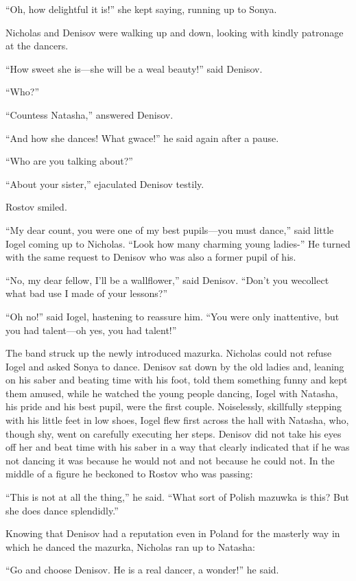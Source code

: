 ``Oh, how delightful it is!'' she kept saying, running up to
Sonya.

Nicholas and Denisov were walking up and down, looking with
kindly patronage at the dancers.

``How sweet she is---she will be a weal beauty!'' said Denisov.

``Who?''

``Countess Natasha,'' answered Denisov.

``And how she dances! What gwace!'' he said again after a pause.

``Who are you talking about?''

``About your sister,'' ejaculated Denisov testily.

Rostov smiled.

``My dear count, you were one of my best pupils---you must
dance,'' said little Iogel coming up to Nicholas. ``Look how many
charming young ladies-'' He turned with the same request to
Denisov who was also a former pupil of his.

``No, my dear fellow, I'll be a wallflower,'' said
Denisov. ``Don't you wecollect what bad use I made of your
lessons?''

``Oh no!'' said Iogel, hastening to reassure him. ``You were only
inattentive, but you had talent---oh yes, you had talent!''

The band struck up the newly introduced mazurka. Nicholas could
not refuse Iogel and asked Sonya to dance. Denisov sat down by
the old ladies and, leaning on his saber and beating time with
his foot, told them something funny and kept them amused, while
he watched the young people dancing, Iogel with Natasha, his
pride and his best pupil, were the first couple. Noiselessly,
skillfully stepping with his little feet in low shoes, Iogel flew
first across the hall with Natasha, who, though shy, went on
carefully executing her steps. Denisov did not take his eyes off
her and beat time with his saber in a way that clearly indicated
that if he was not dancing it was because he would not and not
because he could not. In the middle of a figure he beckoned to
Rostov who was passing:

``This is not at all the thing,'' he said. ``What sort of Polish
mazuwka is this? But she does dance splendidly.''

Knowing that Denisov had a reputation even in Poland for the
masterly way in which he danced the mazurka, Nicholas ran up to
Natasha:

``Go and choose Denisov. He is a real dancer, a wonder!'' he
said.

